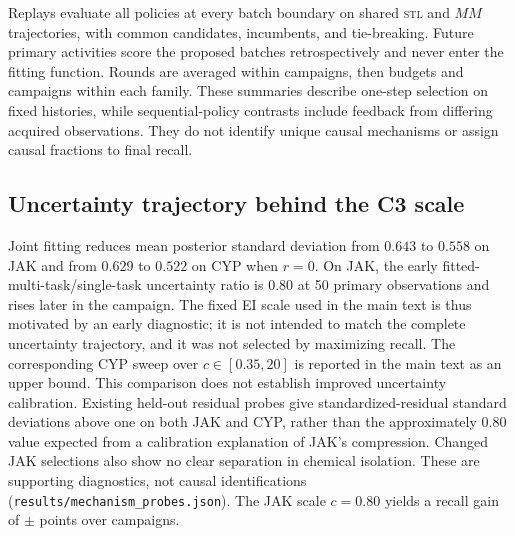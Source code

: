 \documentclass[10pt]{article}
\newcommand{\stl}{\textsc{stl}}
\begin{document}
Replays evaluate all policies at every batch boundary on shared \stl{}
and $MM$ trajectories, with common candidates, incumbents, and tie-breaking.
Future primary activities score the proposed batches retrospectively and
never enter the fitting function. Rounds are averaged within campaigns,
then budgets and campaigns within each family. These summaries describe
one-step selection on fixed histories, while sequential-policy contrasts
include feedback from differing acquired observations. They do not identify
unique causal mechanisms or assign causal fractions to final recall.

\begin{table}[htbp]
\centering\small

\caption{Verified crossed-control recall gains over single-task BO, in
percentage points. Each family averages its two budgets. $M$ denotes measured
and $P$ permuted auxiliary responses (first letter: fitting; second:
conditioning); these rows are the family points in main-text Fig.~3a. The
complete per-budget outcomes and additional
replay metrics are in the independent summary JSON.}
\label{tab:crossed-supp}
\end{table}

\subsection{Uncertainty trajectory behind the C3 scale}

Joint fitting reduces mean posterior standard deviation from $0.643$ to
$0.558$ on JAK and from $0.629$ to $0.522$ on CYP when $r=0$. On JAK, the
early fitted-multi-task/single-task uncertainty ratio is $0.80$ at 50 primary
observations and rises later in the campaign. The fixed EI scale used in the
main text is thus motivated by an early diagnostic; it is not intended to
match the complete uncertainty trajectory, and it was not selected by
maximizing recall. The corresponding CYP sweep over $c\in[0.35,20]$ is
reported in the main text as an upper bound. This comparison does not
establish improved uncertainty calibration. Existing held-out residual
probes give standardized-residual standard deviations above one on both
JAK and CYP, rather than the approximately 0.80 value expected from a
calibration explanation of JAK's compression. Changed JAK selections also
show no clear separation in chemical isolation. These are supporting
diagnostics, not causal identifications (\texttt{results/mechanism\_probes.json}).
The JAK scale $c=0.80$
yields a recall gain of \valScaleMatchedJak{} $\pm$
\semScaleMatchedJak{} points over \nScaleMatchedJak{} campaigns.
\end{document}
